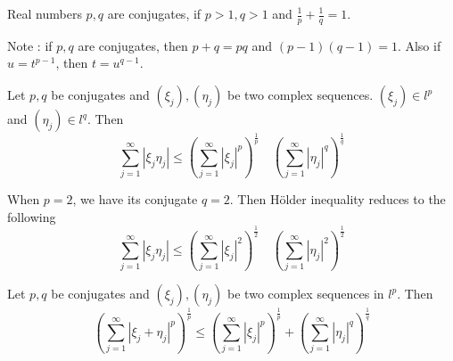 \begin{definition}
	Real numbers $p,q$ are conjugates, if $p>1,q>1$ and $\frac{1}{p}+\frac{1}{q} = 1$.
\end{definition}
Note : if $p,q$ are conjugates, then $p+q=pq$ and $(p-1)(q-1) = 1$.
Also if $u = t^{p-1}$, then $t = u^{q-1}$.

\begin{theorem}
	Let $p,q$ be conjugates and $(\xi_j), (\eta_j)$ be two complex sequences. $(\xi_j) \in l^p$ and $(\eta_j) \in l^q$.
	Then
	\begin{equation}
		\sum_{j=1}^\infty |\xi_j\eta_j| \le \left( \sum_{j=1}^\infty |\xi_j|^p \right)^\frac{1}{p} \quad \left( \sum_{j=1}^\infty |\eta_j|^q \right)^\frac{1}{q}
	\end{equation}
\end{theorem}
\begin{corollary}
	When $p=2$, we have its conjugate $q=2$.
	Then H\"older inequality reduces to the following
	\begin{equation}
		\sum_{j=1}^\infty |\xi_j\eta_j| \le \left( \sum_{j=1}^\infty |\xi_j|^2 \right)^\frac{1}{2} \quad \left( \sum_{j=1}^\infty |\eta_j|^2 \right)^\frac{1}{2}
	\end{equation}

\end{corollary}
\begin{theorem}
	Let $p,q$ be conjugates and $(\xi_j), (\eta_j)$ be two complex sequences in $l^p$.
	Then
	\begin{equation}
		\left( \sum_{j=1}^\infty |\xi_j + \eta_j|^p \right)^\frac{1}{p} \le \left( \sum_{j=1}^\infty |\xi_j|^p \right)^\frac{1}{p} + \left( \sum_{j=1}^\infty |\eta_j|^q \right)^\frac{1}{q}
	\end{equation}
\end{theorem}
